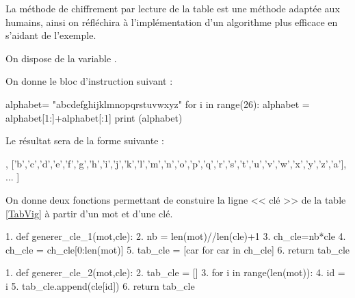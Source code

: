 La méthode de chiffrement par lecture de la table est une méthode adaptée \og aux humains\fg, ainsi on réfléchira à l'implémentation d'un algorithme plus efficace en s'aidant de l'exemple.

On dispose de la variable . 

On donne le bloc d'instruction suivant : 

\begin{pyverbatim}
alphabet= "abcdefghijklmnopqrstuvwxyz"
for i in range(26):
    alphabet = alphabet[1:]+alphabet[:1]
    print (alphabet)
\end{pyverbatim}


Le résultat sera de la forme suivante :
\footnotesize{
\begin{pyverbatim}
[['a','b','c','d','e','f','g','h','i','j','k','l','m','n','o','p','q','r','s','t','u','v','w','x','y','z'], 
 ['b','c','d','e','f','g','h','i','j','k','l','m','n','o','p','q','r','s','t','u','v','w','x','y','z','a'],
 ... ]
\end{pyverbatim}
}

On donne deux fonctions permettant de constuire la ligne << clé >> de la table \ref{TabVig} à partir d'un mot et d'une clé. 
\begin{multicols}{2}
\begin{pyverbatim}
1. def generer_cle_1(mot,cle):
2.     nb = len(mot)//len(cle)+1
3.     ch_cle=nb*cle
4.     ch_cle = ch_cle[0:len(mot)]
5.     tab_cle = [car for car in ch_cle]
6.     return tab_cle
\end{pyverbatim}

\begin{pyverbatim}
1. def generer_cle_2(mot,cle):
2.     tab_cle = []
3.     for i in range(len(mot)):
4.         id = i%
5.         tab_cle.append(cle[id])
6.     return tab_cle
\end{pyverbatim}

\end{multicols}



